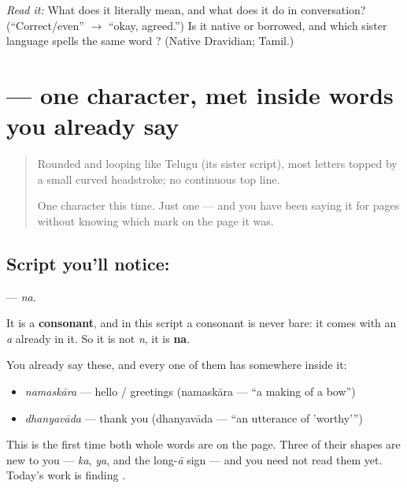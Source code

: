 \begin{tcolorbox}[breakable,colback=teal!4,colframe=teal!35!black,title={Before you move on}]
\emph{Read it:} \textbf{} What does it literally mean, and what does it do in conversation? (\textquotedblleft{}Correct/even\textquotedblright{} $\to$ \textquotedblleft{}okay, agreed.\textquotedblright{}) Is it native or borrowed, and which sister language spells the same word \textbf{}? (Native Dravidian; Tamil.)
\end{tcolorbox}
\section[\texorpdfstring{\kn{ನ} (na)}{ನ (na)}]{ — one character, met inside words you already say}

\label{lesson:KA-S01-letter-na}



\begin{quote}
Rounded and looping like Telugu (its sister script), most letters topped by a small curved headstroke; no continuous top line.

One character this time. Just one — and you have been saying it for pages without knowing which mark on the page it was.
\end{quote}

\subsection*{Script you'll notice: }
\textbf{} — \emph{na}.

It is a \textbf{consonant}, and in this script a consonant is never bare: it comes with an \emph{a} already in it. So it is not \emph{n}, it is \textbf{na}.

You already say these, and every one of them has  somewhere inside it:

\begin{itemize}
\raggedright
  \item \textbf{} \emph{namaskāra} — hello / greetings (namaskāra — \textquotedblleft{}a making of a bow\textquotedblright{})
  \item \textbf{} \emph{dhanyavāda} — thank you (dhanyavāda — \textquotedblleft{}an utterance of 'worthy'\textquotedblright{})
\end{itemize}

This is the first time both whole words are on the page. Three of their shapes are new to you — \textbf{} \emph{ka}, \textbf{} \emph{ya}, and the long-\emph{ā} sign \textbf{} — and you need not read them yet. Today's work is finding .

